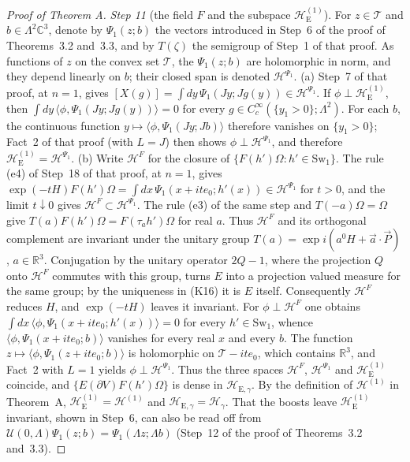 \documentclass[11pt,letterpaper,reqno]{amsart}
\theoremstyle{definition}
\begin{document}
\begin{proof}[Proof of Theorem A]
\emph{Step 11} (the field $F$ and the subspace $\mathcal H_{\mathrm E}^{(1)}$).
For $z\in\mathcal T$ and $b\in\Lambda^2\mathbb C^3$, denote by $\Psi_1(z;b)$ the vectors introduced in Step~6 of the proof of Theorems~3.2 and~3.3, and by $T(\zeta)$ the semigroup of Step~1 of that proof.
As functions of $z$ on the convex set $\mathcal T$, the $\Psi_1(z;b)$ are holomorphic in norm, and they depend linearly on $b$;
their closed span is denoted $\mathcal H^{\Psi_1}$.
(a) Step~7 of that proof, at $n=1$, gives $[X(g)]=\int dy\,\Psi_1(Jy;Jg(y))\in\mathcal H^{\Psi_1}$.
If $\phi\perp\mathcal H_{\mathrm E}^{(1)}$, then $\int dy\,\langle\phi,\Psi_1(Jy;Jg(y))\rangle=0$ for every $g\in C_c^\infty(\{y_1>0\};\Lambda^2)$.
For each $b$, the continuous function $y\mapsto\langle\phi,\Psi_1(Jy;Jb)\rangle$ therefore vanishes on $\{y_1>0\}$;
Fact~2 of that proof (with $L=J$) then shows $\phi\perp\mathcal H^{\Psi_1}$, and therefore $\mathcal H_{\mathrm E}^{(1)}=\mathcal H^{\Psi_1}$.
(b) Write $\mathcal H^F$ for the closure of $\{F(h')\Omega:h'\in\mathrm{Sw}_1\}$.
The rule (e4) of Step~18 of that proof, at $n=1$, gives $\exp(-tH)F(h')\Omega=\allowbreak \int dx\,\allowbreak \Psi_1(x+ite_0;h'(x))\in\mathcal H^{\Psi_1}$ for $t>0$, and the limit $t\downarrow0$ gives $\mathcal H^F\subset\mathcal H^{\Psi_1}$.
The rule (e3) of the same step and $T(-a)\Omega=\Omega$ give $T(a)F(h')\Omega=F(\tau_ah')\Omega$ for real $a$.
Thus $\mathcal H^F$ and its orthogonal complement are invariant under the unitary group $T(a)=\exp i(a^0H+\vec a\cdot\vec P)$, $a\in\mathbb R^3$.
Conjugation by the unitary operator $2Q-1$, where the projection $Q$ onto $\mathcal H^F$ commutes with this group, turns $E$ into a projection valued measure for the same group;
by the uniqueness in (K16) it is $E$ itself.
Consequently $\mathcal H^F$ reduces $H$, and $\exp(-tH)$ leaves it invariant.
For $\phi\perp\mathcal H^F$ one obtains $\int dx\,\langle\phi,\Psi_1(x+ite_0;h'(x))\rangle=0$ for every $h'\in\mathrm{Sw}_1$, whence $\langle\phi,\Psi_1(x+ite_0;b)\rangle$ vanishes for every real $x$ and every $b$.
The function $z\mapsto\langle\phi,\Psi_1(z+ite_0;b)\rangle$ is holomorphic on $\mathcal T-ite_0$, which contains $\mathbb R^3$, and Fact~2 with $L=1$ yields $\phi\perp\mathcal H^{\Psi_1}$.
Thus the three spaces $\mathcal H^F$, $\mathcal H^{\Psi_1}$ and $\mathcal H_{\mathrm E}^{(1)}$ coincide, and $\{E(\partial V)F(h')\Omega\}$ is dense in $\mathcal H_{\mathrm E,\gamma}$.
By the definition of $\mathcal H^{(1)}$ in Theorem~A,
$\mathcal H_{\mathrm E}^{(1)}=\mathcal H^{(1)}$ and
$\mathcal H_{\mathrm E,\gamma}=\mathcal H_\gamma$.
That the boosts leave $\mathcal H_{\mathrm E}^{(1)}$ invariant, shown in Step~6, can also be read off from $\mathcal U(0,\Lambda)\Psi_1(z;b)=\Psi_1(\Lambda z;\Lambda b)$ (Step~12 of the proof of Theorems~3.2 and~3.3).


\end{proof}
\end{document}
